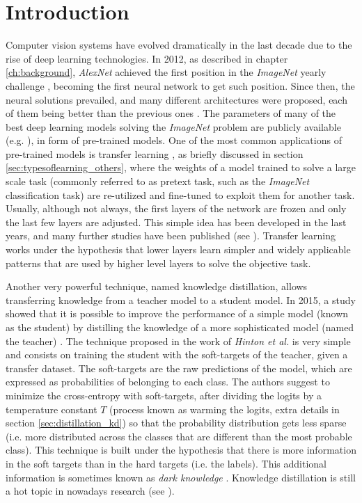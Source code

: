  \section{Introduction}
 Computer vision systems have evolved dramatically in the last decade due to the rise of deep learning technologies. In 2012, as described in chapter \ref{ch:background}, \textit{AlexNet} \autocite{krizhevsky2012} achieved the first position in the \textit{ImageNet} yearly challenge \autocite{ILSVRC15}, becoming the first neural network to get such position. Since then, the neural solutions prevailed, and many different architectures were proposed, each of them being better than the previous ones \autocite{khan2020, algan2021}. The parameters of many of the best deep learning models solving the \textit{ImageNet} problem are publicly available (e.g. \autocite{kaiming2016, chollet2017, szegedy2016, szegedy2017, howard2017, pham2018, tan2019}), in form of pre-trained models. One of the most common applications of pre-trained models is transfer learning \autocite{huang2021}, as briefly discussed in section \ref{sec:typesoflearning_others}, where the weights of a model  trained to solve a large scale task (commonly referred to as pretext task, such as the \textit{ImageNet} classification task) are re-utilized and fine-tuned to exploit them for another task. Usually, although not always, the first layers of the network are frozen and only the last few layers 
 are adjusted. This simple idea has been developed in the last years, and many further studies have been published (see \autocite{evci2022, zhu2018, wu2021, pzhao2021}). Transfer learning works under the hypothesis that lower layers learn simpler and widely applicable patterns that are used by higher level layers to solve the objective task.

 Another very powerful technique, named knowledge distillation, allows transferring knowledge from a teacher model to a student model. In 2015, a study showed that it is possible to improve the performance of a simple model (known as the student) by distilling the knowledge of a more sophisticated model (named the teacher) \autocite{hinton2015}. The technique proposed in the work of \textit{Hinton et al.} is very simple and consists on training the student with the soft-targets of the teacher, given a transfer dataset. The soft-targets are the raw predictions of the model, which are expressed as probabilities of belonging to each class. The authors suggest to minimize the cross-entropy with soft-targets, after dividing the logits by a temperature constant $T$ (process known as warming the logits, extra details in section \ref{sec:distillation_kd}) so that the probability distribution gets less sparse (i.e. more distributed across the classes that are different than the most probable class). This technique is built under the hypothesis that there is more information in the soft targets than in the hard targets (i.e. the labels). This additional information is sometimes known as \textit{dark knowledge} \autocite{gou2020}. Knowledge distillation is still a hot topic in nowadays research (see \autocite{tan2021, zhao2021, lee2021}).

